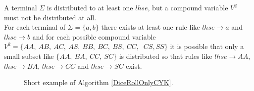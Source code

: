 \noindent
{}
A terminal $\Sigma$ is distributed to at least one $lhse$, but a compound variable $V^2$ must not be distributed at all.\\
For each terminal of $\Sigma=\{a,b\}$ there exists at least one rule like $lhse\rightarrow a$ and $lhse\rightarrow b$ and for each possible compound variable $V^2=\{AA,~AB,~AC,~AS,~BB,~BC,~BS,~CC,$ $~CS,SS\}$ it is possible that only a small subset like $\{AA,~BA,~CC,~SC\}$ is distributed so that rules like $lhse\rightarrow AA$, $lhse\rightarrow BA$, $lhse\rightarrow CC$ and $lhse\rightarrow SC$ exist.
\noindent
\begin{figure} [h]
	\begin{minipage}{6in}
		\centering
	\end{minipage}
	\caption{Short example of Algorithm \ref{DiceRollOnlyCYK}.}
	\label{DiceRollONlyCYKExample}
\end{figure}\\


